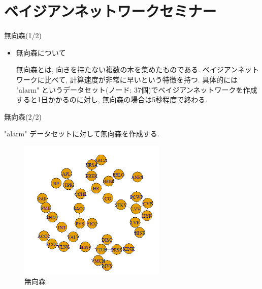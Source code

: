 \documentclass[dvipdfmx]{beamer}
\begin{document}
\section{ベイジアンネットワークセミナー}
\begin{frame}{無向森(1/2)}
\begin{itemize} 
\item{無向森について}

\vspace{0.3cm}

無向森とは, 向きを持たない複数の木を集めたものである. ベイジアンネットワークに比べて, 計算速度が非常に早いという特徴を持つ. 具体的には "alarm" というデータセット(ノード: 37個)でベイジアンネットワークを作成すると1日かかるのに対し, 無向森の場合は5秒程度で終わる. 

\end{itemize}
\end{frame}


\begin{frame}{無向森(2/2)}

"alarm" データセットに対して無向森を作成する.

\begin{figure}[H]
\begin{center}
\includegraphics[width=70mm]{data/forest1.png}
\caption{無向森}
\label{TAN}
\end{center}
\end{figure}
\end{frame}
\end{document}
